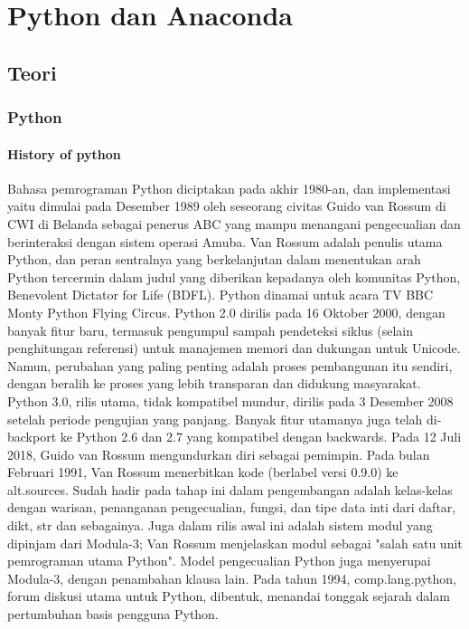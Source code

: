 \chapter{Python dan Anaconda}

\section{Teori}
\subsection{Python}
\par
\subsubsection{History of python}
Bahasa pemrograman Python diciptakan pada akhir 1980-an, dan implementasi yaitu dimulai pada Desember 1989 oleh seseorang civitas Guido van Rossum di CWI di Belanda sebagai penerus ABC yang mampu menangani pengecualian dan berinteraksi dengan sistem operasi Amuba. Van Rossum adalah penulis utama Python, dan peran sentralnya yang berkelanjutan dalam menentukan arah Python tercermin dalam judul yang diberikan kepadanya oleh komunitas Python, Benevolent Dictator for Life (BDFL). Python dinamai untuk acara TV BBC Monty Python Flying Circus.
Python 2.0 dirilis pada 16 Oktober 2000, dengan banyak fitur baru, termasuk pengumpul sampah pendeteksi siklus (selain penghitungan referensi) untuk manajemen memori dan dukungan untuk Unicode. Namun, perubahan yang paling penting adalah proses pembangunan itu sendiri, dengan beralih ke proses yang lebih transparan dan didukung masyarakat.
Python 3.0, rilis utama, tidak kompatibel mundur, dirilis pada 3 Desember 2008 setelah periode pengujian yang panjang. Banyak fitur utamanya juga telah di-backport ke Python 2.6 dan 2.7 yang kompatibel dengan backwards.
Pada 12 Juli 2018, Guido van Rossum mengundurkan diri sebagai pemimpin.
Pada bulan Februari 1991, Van Rossum menerbitkan kode (berlabel versi 0.9.0) ke alt.sources. Sudah hadir pada tahap ini dalam pengembangan adalah kelas-kelas dengan warisan, penanganan pengecualian, fungsi, dan tipe data inti dari daftar, dikt, str dan sebagainya. Juga dalam rilis awal ini adalah sistem modul yang dipinjam dari Modula-3; Van Rossum menjelaskan modul sebagai "salah satu unit pemrograman utama Python". Model pengecualian Python juga menyerupai Modula-3, dengan penambahan klausa lain. Pada tahun 1994, comp.lang.python, forum diskusi utama untuk Python, dibentuk, menandai tonggak sejarah dalam pertumbuhan basis pengguna Python.
\\
